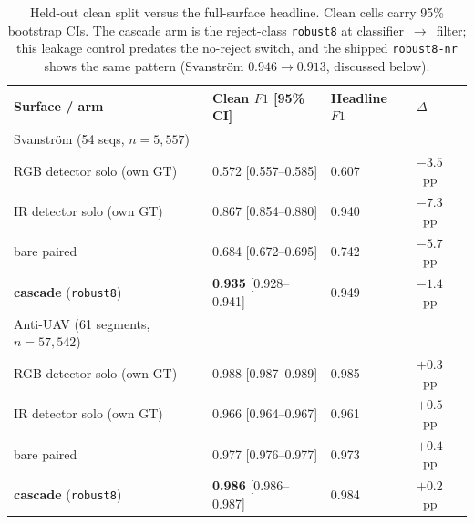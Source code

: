 \begin{table}[htbp]
    \centering
    \caption{Held-out clean split versus the full-surface headline. Clean cells carry 95\% bootstrap CIs. The cascade arm is the reject-class \texttt{robust8} at classifier~$\to$~filter; this leakage control predates the no-reject switch, and the shipped \texttt{robust8-nr} shows the same pattern (Svanstr\"om $0.946 \to 0.913$, discussed below).}
    \label{tab:clean_split}
    \footnotesize
    \begin{tabular}{llll}
        \toprule
        Surface / arm & Clean $F1$ [95\% CI] & Headline $F1$ & $\Delta$ \\
        \midrule
        Svanstr\"om (54 seqs, $n=5{,}557$) & & & \\
        \quad RGB detector solo (own GT) & 0.572 [0.557--0.585] & 0.607 & $-3.5$~pp \\
        \quad IR detector solo (own GT)  & 0.867 [0.854--0.880] & 0.940 & $-7.3$~pp \\
        \quad bare paired                & 0.684 [0.672--0.695] & 0.742 & $-5.7$~pp \\
        \quad \textbf{cascade} (\texttt{robust8}) & \textbf{0.935} [0.928--0.941] & 0.949 & $-1.4$~pp \\
        \midrule
        Anti-UAV (61 segments, $n=57{,}542$) & & & \\
        \quad RGB detector solo (own GT) & 0.988 [0.987--0.989] & 0.985 & $+0.3$~pp \\
        \quad IR detector solo (own GT)  & 0.966 [0.964--0.967] & 0.961 & $+0.5$~pp \\
        \quad bare paired                & 0.977 [0.976--0.977] & 0.973 & $+0.4$~pp \\
        \quad \textbf{cascade} (\texttt{robust8}) & \textbf{0.986} [0.986--0.987] & 0.984 & $+0.2$~pp \\
        \bottomrule
    \end{tabular}
\end{table}

